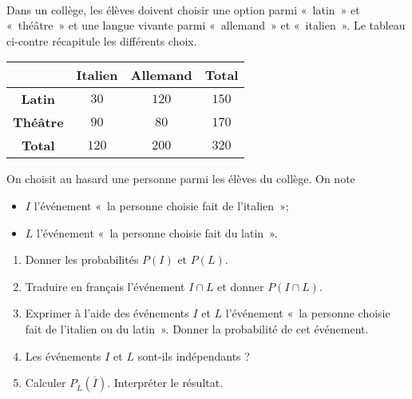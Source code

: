 \documentclass[11pt]{article}
\begin{document}
\begin{exo}[$6$ points]~\\
\begin{minipage}{.55\textwidth}
Dans un collège, les élèves doivent choisir une option parmi «~latin~»
et «~thé\^atre~» et une langue vivante parmi «~allemand~» et «~italien~». Le
tableau ci-contre récapitule les différents choix.
\end{minipage}
\begin{minipage}{.45\textwidth}
  \begin{center}
 \begin{tabular}{cccc}
  \toprule
  & \textbf{Italien} & \textbf{Allemand} & \textbf{Total} \\
  \midrule
  \textbf{Latin} & $30$ & $120$ & $150$ \\
  \textbf{Thé\^atre} & $90$ & $80$ & $170$ \\
  \textbf{Total} & $120$ & $200$ & $320$ \\
  \bottomrule
\end{tabular}
  \end{center}
\end{minipage}
On choisit au hasard une personne parmi les élèves du collège. On note
\begin{itemize}
  \item $I$ l'événement «~la personne choisie fait de l'italien~»;
  \item $L$ l'événement «~la personne choisie fait du latin~».
\end{itemize}
\begin{enumerate}
  \item Donner les probabilités $P(I)$ et $P(L)$.
  \item Traduire en français l'événement $I\cap L$ et donner $P(I\cap L)$.
  \item Exprimer à l'aide des événements $I$ et $L$ l'événement «~la personne
    choisie fait de l'italien ou du latin~». Donner la probabilité de cet
    événement.
  \item Les événements $I$ et $L$ sont-ils indépendants ?
  \item Calculer $P_{\overline L}(\overline I)$. Interpréter le résultat.
\end{enumerate}
\end{exo}
\end{document}
